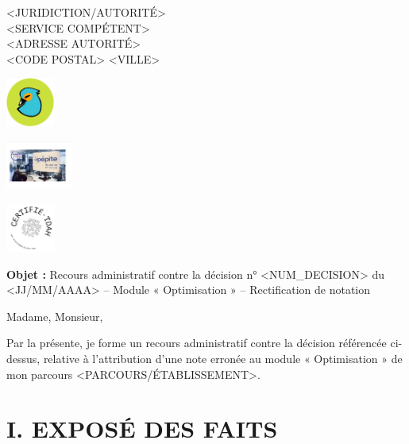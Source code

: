 \documentclass[12pt,french]{scrlttr2}
\begin{document}
\begin{letter}{
<JURIDICTION/AUTORITÉ>\\
<SERVICE COMPÉTENT>\\
<ADRESSE AUTORITÉ>\\
<CODE POSTAL> <VILLE>
}

\opening{}

\begin{center}
\begin{minipage}{0.3\textwidth}
\centering
\includegraphics[height=1.6cm]{logos/bird_logo.png}
\end{minipage}
\begin{minipage}{0.3\textwidth}
\centering
\includegraphics[height=1.6cm]{logos/pepite_sorbonne.png}
\end{minipage}
\begin{minipage}{0.3\textwidth}
\centering
\includegraphics[height=1.6cm]{logos/certifie_TDAH.webp}
\end{minipage}
\end{center}

\vspace{1cm}

\textbf{Objet :} Recours administratif contre la décision n° <NUM_DECISION> du <JJ/MM/AAAA> – Module « Optimisation » – Rectification de notation

\vspace{0.5cm}

Madame, Monsieur,

Par la présente, je forme un recours administratif contre la décision référencée ci-dessus, relative à l'attribution d'une note erronée au module « Optimisation » de mon parcours <PARCOURS/ÉTABLISSEMENT>.

\section*{I. EXPOSÉ DES FAITS}


\end{letter}
\end{document}
